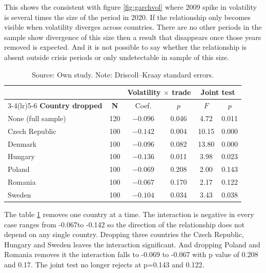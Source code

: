 \vspace{\baselineskip}

This shows the consistent with figure \ref{fig:garchvol} where 2009 spike in volatility is several times the size of the period in 2020.
If the relationship only becomes visible when volatility diverges across countries.
There are no other periods in the sample show divergence of this size then a result that disappears once those years removed is expected.
And it is not possible to say whether the relationship is absent outside crisis periods or only undetectable in sample of this size.


\begin{table}[H]
    \centering
    \caption{Sensitivity to sample composition}
    \vspace{\baselineskip}
    \begin{tabular}{lccccc}
        \toprule
        & & \multicolumn{2}{c}{Volatility $\times$ trade} & \multicolumn{2}{c}{Joint test} \\
        \cmidrule(lr){3-4}\cmidrule(lr){5-6}
        \textbf{Country dropped} & \textbf{N} & Coef. & $p$ & $F$ & $p$ \\
        \midrule
        None (full sample)      & 120 & $-0.096$ & 0.046 & 4.72  & 0.011 \\
        \midrule
        Czech Republic          & 100 & $-0.142$ & 0.004 & 10.15 & 0.000 \\
        Denmark                 & 100 & $-0.096$ & 0.082 & 13.80 & 0.000 \\
        Hungary                 & 100 & $-0.136$ & 0.011 & 3.98  & 0.023 \\
        Poland                  & 100 & $-0.069$ & 0.208 & 2.00  & 0.143 \\
        Romania                 & 100 & $-0.067$ & 0.170 & 2.17  & 0.122 \\
        Sweden                  & 100 & $-0.104$ & 0.034 & 3.43  & 0.038 \\
        \bottomrule
    \end{tabular}
    \vspace{\baselineskip}
    \caption*{\footnotesize Source: Own study. Note: Driscoll--Kraay standard errors.}
    
    \label{tab:robust_country}
\end{table}

The table \ref{tab:robust_country} removes one country at a time.
The interaction is negative in every case ranges from -0.067to -0.142 so the direction of the relationship does not depend on any single country.
Dropping three countries the Czech Republic, Hungary and Sweden leaves the interaction significant.
And dropping Poland and Romania removes it the interaction falls to -0.069 to -0.067 with p value of 0.208 and 0.17.
The joint test no longer rejects at p=0.143 and 0.122.

